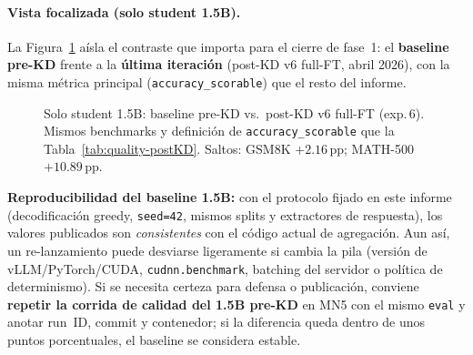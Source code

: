 \documentclass[11pt,a4paper]{article}
\begin{document}
\paragraph{Vista focalizada (solo student 1.5B).}
La Figura~\ref{fig:1p5b-baseline-vs-v6} a\'isla el contraste que importa para
el cierre de fase~1: el \textbf{baseline pre-KD} frente a la \textbf{\'ultima
iteraci\'on} (post-KD v6 full-FT, abril 2026), con la misma m\'etrica principal
(\texttt{accuracy\_scorable}) que el resto del informe.

\begin{figure}[H]
\centering
{}
\caption{Solo student 1.5B: baseline pre-KD vs.\ post-KD v6 full-FT
(exp.\,6). Mismos benchmarks y definici\'on de \texttt{accuracy\_scorable}
que la Tabla~\ref{tab:quality-postKD}. Saltos: GSM8K $+2.16$\,pp;
MATH-500 $+10.89$\,pp.}
\label{fig:1p5b-baseline-vs-v6}
\end{figure}

\begin{warningbox}
\small
\textbf{Reproducibilidad del baseline 1.5B:} con el protocolo fijado en este
informe (decodificaci\'on greedy, \texttt{seed=42}, mismos splits y
extractores de respuesta), los valores publicados son \emph{consistentes}
con el c\'odigo actual de agregaci\'on. Aun as\'i, un re-lanzamiento puede
desviarse ligeramente si cambia la pila (versi\'on de vLLM/PyTorch/CUDA,
\texttt{cudnn.benchmark}, batching del servidor o pol\'itica de
determinismo). Si se necesita certeza para defensa o publicaci\'on, conviene
\textbf{repetir la corrida de calidad del 1.5B pre-KD} en MN5 con el mismo
\texttt{eval} y anotar run~ID, commit y contenedor; si la diferencia queda
dentro de unos puntos porcentuales, el baseline se considera estable.
\end{warningbox}
\end{document}
